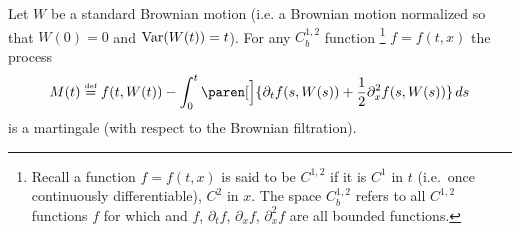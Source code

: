 \begin{theorem}
  Let $W$ be a standard Brownian motion (i.e. a Brownian motion normalized so that $W(0) = 0$ and $\operatorname{Var}(W(t)) = t$).
  For any $C^{1,2}_b$ function%
  \footnote{%
    Recall a function $f = f(t, x)$ is said to be $C^{1,2}$ if it is $C^1$ in $t$ (i.e.\ once continuously differentiable), $C^2$ in $x$.
    The space $C^{1,2}_b$ refers to all $C^{1,2}$ functions $f$ for which and $f$, $\partial_t f$, $\partial_x f$, $\partial_x^2 f$ are all bounded functions.%
  }
  $f = f(t, x)$ the process
  \begin{equation*}
    M(t) \defeq f(t, W(t))
      - \int_0^t \paren[\Big]{
	  \partial_t f(s, W(s)) + \frac{1}{2} \partial_x^2 f(s, W(s))
	} \, ds
  \end{equation*}
  is a martingale (with respect to the Brownian filtration).
\end{theorem}
